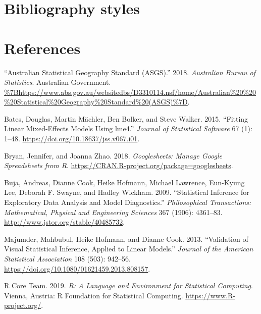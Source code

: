 \documentclass[conference,final,]{IEEEtran}
\begin{document}
\hypertarget{bibliography-styles}{%
\section{Bibliography styles}\label{bibliography-styles}}

\newpage

\hypertarget{references}{%
\section{References}\label{references}}

\hypertarget{refs}{}
\leavevmode\hypertarget{ref-abs2016}{}%
``Australian Statistical Geography Standard (ASGS).'' 2018.
\emph{Australian Bureau of Statistics}. Australian Government.
\url{\%7Bhttps://www.abs.gov.au/websitedbs/D3310114.nsf/home/Australian\%20\%20\%20Statistical\%20Geography\%20Standard\%20(ASGS)\%7D}.

\leavevmode\hypertarget{ref-lme4}{}%
Bates, Douglas, Martin Mächler, Ben Bolker, and Steve Walker. 2015.
``Fitting Linear Mixed-Effects Models Using lme4.'' \emph{Journal of
Statistical Software} 67 (1): 1--48.
\url{https://doi.org/10.18637/jss.v067.i01}.

\leavevmode\hypertarget{ref-sheets}{}%
Bryan, Jennifer, and Joanna Zhao. 2018. \emph{Googlesheets: Manage
Google Spreadsheets from R}.
\url{https://CRAN.R-project.org/package=googlesheets}.

\leavevmode\hypertarget{ref-SIEDAMD}{}%
Buja, Andreas, Dianne Cook, Heike Hofmann, Michael Lawrence, Eun-Kyung
Lee, Deborah F. Swayne, and Hadley Wlckham. 2009. ``Statistical
Inference for Exploratory Data Analysis and Model Diagnostics.''
\emph{Philosophical Transactions: Mathematical, Physical and Engineering
Sciences} 367 (1906): 4361--83.
\url{http://www.jstor.org/stable/40485732}.

\leavevmode\hypertarget{ref-VVSIALM}{}%
Majumder, Mahbubul, Heike Hofmann, and Dianne Cook. 2013. ``Validation
of Visual Statistical Inference, Applied to Linear Models.''
\emph{Journal of the American Statistical Association} 108 (503):
942--56. \url{https://doi.org/10.1080/01621459.2013.808157}.

\leavevmode\hypertarget{ref-RCore}{}%
R Core Team. 2019. \emph{R: A Language and Environment for Statistical
Computing}. Vienna, Austria: R Foundation for Statistical Computing.
\url{https://www.R-project.org/}.
\end{document}
